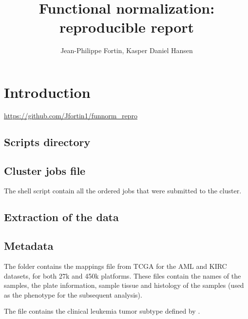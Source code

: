 \documentclass[12pt]{article}
\title{Functional normalization: reproducible report}
\author{Jean-Philippe Fortin, Kasper Daniel Hansen}
\begin{document}
\maketitle{}
\setcounter{secnumdepth}{1} 

\section{Introduction}

 \url{https://github.com/Jfortin1/funnorm_repro}

\begin{knitrout}
\color{fgcolor}\begin{kframe}
\begin{alltt}
 \hlkwb{<-} 
\hlstd{(}\hlstd{)}
\end{alltt}
\end{kframe}
\end{knitrout}

\subsection{Scripts directory}
\subsection{Cluster jobs file}

The shell script  contain all the ordered jobs that were submitted to the cluster. 

\subsection{Extraction of the data}
\subsection{Metadata}
The folder  contains the mappings file from TCGA for the AML and KIRC datasets, for both 27k and 450k platforms. These  files contain the names of the samples, the plate information, sample tissue and histology of the samples (used as the phenotype for the subsequent analysis). 

The file  contains the clinical leukemia tumor subtype defined by . 
\end{document}
